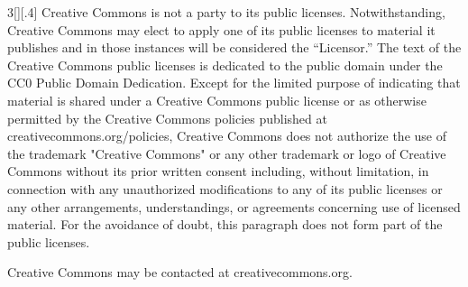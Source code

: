 \documentclass[8pt,a4paper]{article}
\begin{document}
\begin{multicols}{3}[][.4\paperwidth]
Creative Commons is not a party to its public
licenses. Notwithstanding, Creative Commons may elect to apply one of
its public licenses to material it publishes and in those instances
will be considered the “Licensor.” The text of the Creative Commons
public licenses is dedicated to the public domain under the CC0 Public
Domain Dedication. Except for the limited purpose of indicating that
material is shared under a Creative Commons public license or as
otherwise permitted by the Creative Commons policies published at
creativecommons.org/policies, Creative Commons does not authorize the
use of the trademark "Creative Commons" or any other trademark or logo
of Creative Commons without its prior written consent including,
without limitation, in connection with any unauthorized modifications
to any of its public licenses or any other arrangements,
understandings, or agreements concerning use of licensed material. For
the avoidance of doubt, this paragraph does not form part of the
public licenses.

\smallskip

Creative Commons may be contacted at creativecommons.org.

\end{multicols}
\end{document}
